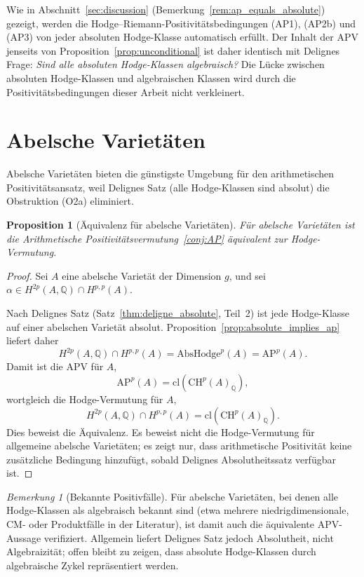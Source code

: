 \documentclass[aps,prd,twocolumn,superscriptaddress,nofootinbib]{revtex4-2}
\newtheorem{proposition}[theorem]{Proposition}
\theoremstyle{definition}
\theoremstyle{remark}
\newtheorem{remark}[theorem]{Bemerkung}
\begin{document}
Wie in Abschnitt~\ref{sec:discussion} (Bemerkung~\ref{rem:ap_equals_absolute}) gezeigt, werden die Hodge--Riemann-Positivitätsbedingungen (AP1), (AP2b) und (AP3) von jeder absoluten Hodge-Klasse automatisch erfüllt. Der Inhalt der APV jenseits von Proposition~\ref{prop:unconditional} ist daher identisch mit Delignes Frage: \textit{Sind alle absoluten Hodge-Klassen algebraisch?} Die \glqq Lücke\grqq{} zwischen absoluten Hodge-Klassen und algebraischen Klassen wird durch die Positivitätsbedingungen dieser Arbeit nicht verkleinert.


\section{Abelsche Varietäten}
\label{sec:abelian}

Abelsche Varietäten bieten die günstigste Umgebung für den arithmetischen Positivitätsansatz, weil Delignes Satz (alle Hodge-Klassen sind absolut) die Obstruktion (O2a) eliminiert.

\begin{proposition}[Äquivalenz für abelsche Varietäten]
\label{thm:abelian}
Für abelsche Varietäten ist die Arithmetische Positivitätsvermutung~\ref{conj:AP} äquivalent zur Hodge-Vermutung.
\end{proposition}

\begin{proof}
Sei $A$ eine abelsche Varietät der Dimension $g$, und sei $\alpha \in H^{2p}(A, \mathbb{Q}) \cap H^{p,p}(A)$.

Nach Delignes Satz (Satz~\ref{thm:deligne_absolute}, Teil~2) ist jede Hodge-Klasse auf einer abelschen Varietät absolut. Proposition~\ref{prop:absolute_implies_ap} liefert daher
\[
H^{2p}(A,\mathbb{Q})\cap H^{p,p}(A)=\mathrm{AbsHodge}^p(A)=\mathrm{AP}^p(A).
\]
Damit ist die APV für $A$,
\[
\mathrm{AP}^p(A)=\mathrm{cl}(\mathrm{CH}^p(A)_{\mathbb{Q}}),
\]
wortgleich die Hodge-Vermutung für $A$,
\[
H^{2p}(A,\mathbb{Q})\cap H^{p,p}(A)
=\mathrm{cl}(\mathrm{CH}^p(A)_{\mathbb{Q}}).
\]
Dies beweist die Äquivalenz. Es beweist nicht die Hodge-Vermutung für allgemeine abelsche Varietäten; es zeigt nur, dass arithmetische Positivität keine zusätzliche Bedingung hinzufügt, sobald Delignes Absolutheitssatz verfügbar ist.
\end{proof}

\begin{remark}[Bekannte Positivfälle]
Für abelsche Varietäten, bei denen alle Hodge-Klassen als algebraisch bekannt sind (etwa mehrere niedrigdimensionale, CM- oder Produktfälle in der Literatur), ist damit auch die äquivalente APV-Aussage verifiziert. Allgemein liefert Delignes Satz jedoch Absolutheit, nicht Algebraizität; offen bleibt zu zeigen, dass absolute Hodge-Klassen durch algebraische Zykel repräsentiert werden.
\end{remark}
\end{document}
